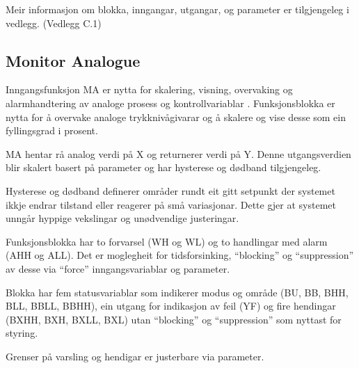 Meir informasjon om blokka, inngangar, utgangar, og parameter er tilgjengeleg i vedlegg. (Vedlegg C.1)

\newpage

\subsection{Monitor Analogue}
Inngangsfunksjon \gls{MA} er nytta for skalering, visning, overvaking og alarmhandtering av
analoge prosess og kontrollvariablar \citep{IEC-63131}.
Funksjonsblokka er nytta for å overvake analoge trykknivågivarar 
og å skalere og vise desse som ein fyllingsgrad i prosent.

\gls{MA} hentar rå analog verdi på X og returnerer verdi på Y.
Denne utgangsverdien blir skalert basert på parameter og har hysterese og dødband tilgjengeleg.

Hysterese og dødband definerer områder rundt eit gitt setpunkt der systemet 
ikkje endrar tilstand eller reagerer på små variasjonar.
Dette gjer at systemet unngår hyppige vekslingar og unødvendige justeringar.

Funksjonsblokka har to forvarsel (WH og WL) og to handlingar med alarm (AHH og ALL).
Det er moglegheit for tidsforsinking, ``blocking'' og ``suppression'' av desse via ``force'' inngangsvariablar og parameter.

Blokka har fem statusvariablar som indikerer modus og område (BU, BB, BHH, BLL, BBLL, BBHH), ein utgang for indikasjon av feil (YF)
og fire hendingar (BXHH, BXH, BXLL, BXL) utan ``blocking'' og ``suppression'' som nyttast for styring.

Grenser på varsling og hendigar er justerbare via parameter.

